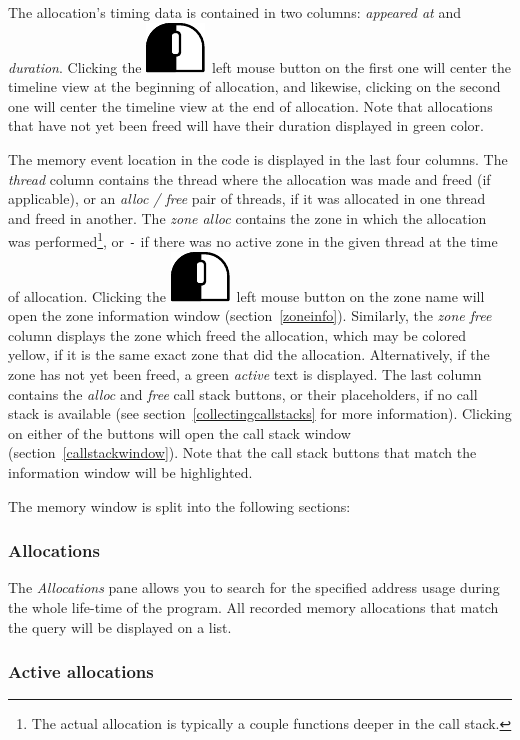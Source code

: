 \documentclass[hidelinks,titlepage,a4paper]{article}
\newcommand{\LMB}{\includegraphics[height=.8\baselineskip]{icons/lmb}}
\begin{document}
The allocation's timing data is contained in two columns: \emph{appeared at} and \emph{duration}. Clicking the \LMB{}~left mouse button on the first one will center the timeline view at the beginning of allocation, and likewise, clicking on the second one will center the timeline view at the end of allocation. Note that allocations that have not yet been freed will have their duration displayed in green color.

The memory event location in the code is displayed in the last four columns. The \emph{thread} column contains the thread where the allocation was made and freed (if applicable), or an \emph{alloc / free} pair of threads, if it was allocated in one thread and freed in another. The \emph{zone alloc} contains the zone in which the allocation was performed\footnote{The actual allocation is typically a couple functions deeper in the call stack.}, or \texttt{-} if there was no active zone in the given thread at the time of allocation. Clicking the \LMB{}~left mouse button on the zone name will open the zone information window (section~\ref{zoneinfo}). Similarly, the \emph{zone free} column displays the zone which freed the allocation, which may be colored yellow, if it is the same exact zone that did the allocation. Alternatively, if the zone has not yet been freed, a green \emph{active} text is displayed. The last column contains the \emph{alloc} and \emph{free} call stack buttons, or their placeholders, if no call stack is available (see section~\ref{collectingcallstacks} for more information). Clicking on either of the buttons will open the call stack window (section~\ref{callstackwindow}). Note that the call stack buttons that match the information window will be highlighted.

The memory window is split into the following sections:

\subsubsection{Allocations}

The \emph{\faAt{} Allocations} pane allows you to search for the specified address usage during the whole life-time of the program. All recorded memory allocations that match the query will be displayed on a list.

\subsubsection{Active allocations}
\end{document}
